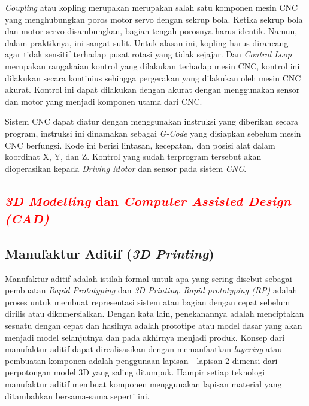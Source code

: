 \textit{Coupling} atau kopling merupakan merupakan salah satu komponen mesin CNC yang menghubungkan poros motor servo dengan sekrup bola. Ketika sekrup bola dan motor servo disambungkan, bagian tengah porosnya harus identik. Namun, dalam praktiknya, ini sangat sulit. Untuk alasan ini, kopling harus dirancang agar tidak sensitif terhadap pusat rotasi yang tidak sejajar. Dan \textit{Control Loop} merupakan rangakaian kontrol yang dilakukan terhadap mesin CNC, kontrol ini dilakukan secara kontinius sehingga pergerakan yang dilakukan oleh mesin CNC akurat. Kontrol ini dapat dilakukan dengan akurat dengan menggunakan sensor dan motor yang menjadi komponen utama dari CNC.

Sistem CNC dapat diatur dengan menggunakan instruksi yang diberikan secara program, instruksi ini dinamakan sebagai \textit{G-Code} yang disiapkan sebelum mesin CNC berfungsi. Kode ini berisi lintasan, kecepatan, dan posisi alat dalam koordinat X, Y, dan Z. Kontrol yang sudah terprogram tersebut akan dioperasikan kepada \textit{Driving Motor} dan sensor pada sistem \textit{CNC}. \parencite{cnc}

\subsection{\textcolor{red}{\textit{3D Modelling} dan \textit{Computer Assisted Design (CAD)}}}

\lipsum[15]

\subsection{Manufaktur Aditif (\textit{3D Printing})}
Manufaktur aditif adalah istilah formal untuk apa yang sering disebut sebagai pembuatan \textit{Rapid Prototyping} dan \textit{3D Printing}. \textit{Rapid prototyping (RP)} adalah proses untuk membuat representasi sistem atau bagian dengan cepat sebelum dirilis atau dikomersialkan. Dengan kata lain, penekanannya adalah menciptakan sesuatu dengan cepat dan hasilnya adalah prototipe atau model dasar yang akan menjadi model selanjutnya dan pada akhirnya menjadi produk. Konsep dari manufaktur aditif dapat direalisasikan dengan memanfaatkan \textit{layering} atau pembuatan komponen adalah penggunaan lapisan - lapisan 2-dimensi dari perpotongan model 3D yang saling ditumpuk. Hampir setiap teknologi manufaktur aditif membuat komponen menggunakan lapisan material yang ditambahkan bersama-sama seperti ini.

